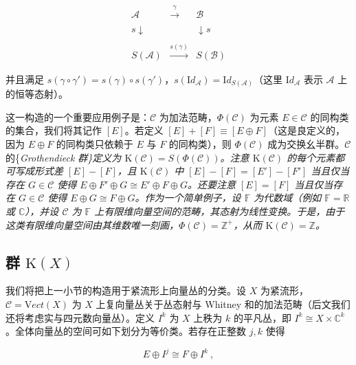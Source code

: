 \documentclass[11pt,a4paper]{ctexart}
\newcommand{\SrcRange}[2]{\marginpar{\raggedright\footnotesize 原文 p.#1}}
\begin{document}
\[{\begin{array}{ccc}
{\mathcal A}&\stackrel{\gamma}{\longrightarrow}&{\mathcal B}\\&
&\\{\scriptstyle s}\downarrow& &\downarrow{\scriptstyle s}\\&
&\\S({\mathcal A})&\stackrel{s(\gamma)}{\longrightarrow}&S({\mathcal B})\end{array}}\]

并且满足 \(s(\gamma\circ\gamma')=s(\gamma)\circ s(\gamma')\)，\(s({\mathrm Id}_{{\mathcal A}})={\mathrm Id}_{S({\mathcal A})}\)（这里 \({\mathrm Id}_{\mathcal A}\) 表示 \({\mathcal A}\) 上的恒等态射）。

这一构造的一个重要应用例子是：\({\mathcal C}\) 为加法范畴，\(\Phi({\mathcal C})\) 为元素 \(E\in{\mathcal C}\) 的同构类的集合，我们将其记作 \([E]\)。若定义 \([E]+[F]\equiv [E\oplus F]\)（这是良定义的，因为 \(E\oplus F\) 的同构类只依赖于 \(E\) 与 \(F\) 的同构类），则 \(\Phi({\mathcal C})\) 成为交换幺半群。\({\mathcal C}\) 的\{\it Grothendieck 群\}定义为 \({\mathrm K}({\mathcal C})=S(\Phi({\mathcal C}))\)。注意 \({\mathrm K}({\mathcal C})\) 的每个元素都可写成形式差 \([E]-[F]\)，且 \({\mathrm K}({\mathcal C})\) 中 \([E]-[F]=[E']-[F']\) 当且仅当存在 \(G\in{\mathcal C}\) 使得 \(E\oplus F'\oplus G \cong E'\oplus F\oplus G\)。还要注意 \([E]=[F]\) 当且仅当存在 \(G\in{\mathcal C}\) 使得 \(E\oplus G \cong F \oplus G\)。作为一个简单例子，设 \({\mathbb{F}}\) 为代数域（例如 \({\mathbb{F}}={\mathbb{R}}\) 或 \({\mathbb{C}}\)），并设 \({\mathcal C}\) 为 \({\mathbb{F}}\) 上有限维向量空间的范畴，其态射为线性变换。于是，由于这类有限维向量空间由其维数唯一刻画，\(\Phi({\mathcal C})={\mathbb{Z}}^+\)，从而 \({\mathrm K}({\mathcal C})={\mathbb{Z}}\)。

\SrcRange{13}{13}
\subsection{\texorpdfstring{群 \({\mathrm K}(X)\)}{群 \{\textbackslash mathrm K\}(X)}}\label{ux7fa4-mathrm-kx}

我们将把上一小节的构造用于紧流形上向量丛的分类。设 \(X\) 为紧流形，\({\mathcal C}={\mathrm Vect}(X)\) 为 \(X\) 上复向量丛关于丛态射与 Whitney 和的加法范畴（后文我们还将考虑实与四元数向量丛）。定义 \(I^k\) 为 \(X\) 上秩为 \(k\) 的平凡丛，即 \(I^k\cong X\times {\mathbb{C}}^k\)。全体向量丛的空间可如下划分为等价类。若存在正整数 \(j,k\) 使得

\[E\oplus I^j\cong F\oplus I^k\ ,\]
\end{document}
